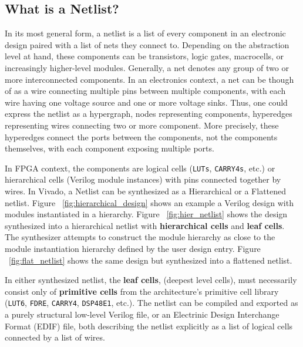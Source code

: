\subsection{What is a Netlist?}
\label{subsec:netlist}
In its most general form, a netlist is a list of every component in an electronic design paired with a list of nets they connect to. 
Depending on the abstraction level at hand, these components can be transistors, logic gates, macrocells, or increasingly higher-level modules. 
Generally, a net denotes any group of two or more interconnected components.
In an electronics context, a net can be though of as a wire connecting multiple pins between multiple components, with each wire having one voltage source and one or more voltage sinks. 
Thus, one could express the netlist as a hypergraph, nodes representing components, hyperedges representing wires connecting two or more component. 
More precisely, these hyperedges connect the ports between the components, not the components themselves, with each component exposing multiple ports. 

In FPGA context, the components are logical cells (\texttt{LUTs}, \texttt{CARRY4s}, etc.) or hierarchical cells (Verilog module instances) with pins connected together by wires. 
In Vivado, a Netlist can be synthesized as a Hierarchical or a Flattened netlist. 
Figure ~\ref{fig:hierarchical_design} shows an example a Verilog design with modules instantiated in a hierarchy. 
Figure ~\ref{fig:hier_netlist} shows the design synthesized into a hierarchical netlist with \textbf{hierarchical cells} and \textbf{leaf cells}. 
The synthesizer attempts to construct the module hierarchy as close to the module instantiation hierarchy defined by the user design entry. 
Figure ~\ref{fig:flat_netlist} shows the same design but synthesized into a flattened netlist. 

In either synthesized netlist, the \textbf{leaf cells}, (deepest level cells), must necessarily consist only of \textbf{primitive cells} from the architecture's primitive cell library (\texttt{LUT6}, \texttt{FDRE}, \texttt{CARRY4}, \texttt{DSP48E1}, etc.). 
The netlist can be compiled and exported as a purely structural low-level Verilog file, or an Electrinic Design Interchange Format (EDIF) file, both describing the netlist explicitly as a list of logical cells connected by a list of wires. 

